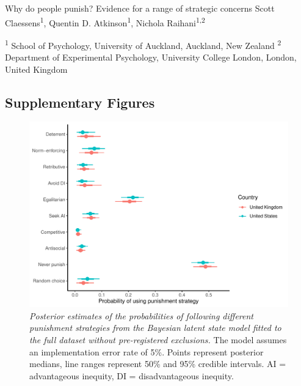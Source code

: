 \documentclass[
  man,floatsintext]{apa6}
\begin{document}
\setcounter{page}{1}
\centering

\noindent \hspace*{10mm} \small Why do people punish? Evidence for a range of strategic concerns \newline
\hspace*{1cm} \small Scott Claessens\textsuperscript{1}, Quentin D. Atkinson\textsuperscript{1}, Nichola Raihani\textsuperscript{1,2} \newline

\raggedright

\noindent \footnotesize \textsuperscript{1} School of Psychology, University of Auckland, Auckland, New Zealand \newline
\noindent \footnotesize \textsuperscript{2} Department of Experimental Psychology, University College London, London, United Kingdom \newline
\normalsize
\newpage

\hypertarget{supplementary-figures}{%
\subsection{Supplementary Figures}\label{supplementary-figures}}








\begin{figure}
\centering
\includegraphics{manuscript_files/figure-latex/plotModel1a-1.pdf}
\caption{\label{fig:plotModel1a}\emph{Posterior estimates of the probabilities of following
different punishment strategies from the Bayesian latent state model fitted to
the full dataset without pre-registered exclusions.} The model assumes an
implementation error rate of 5\%. Points represent posterior medians, line ranges
represent 50\% and 95\% credible intervals. AI = advantageous inequity, DI =
disadvantageous inequity.}
\end{figure}
\end{document}
